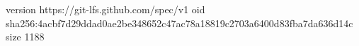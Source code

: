 version https://git-lfs.github.com/spec/v1
oid sha256:4acbf7d29ddad0ae2be348652c47ac78a18819c2703a6400d83fba7da636d14c
size 1188
